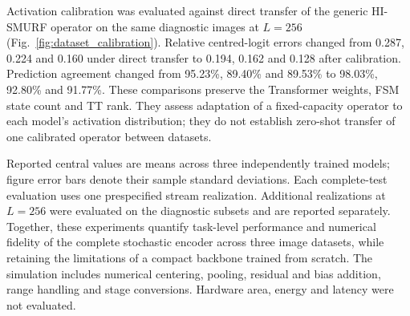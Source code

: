 Activation calibration was evaluated against direct transfer of the
generic HI-SMURF operator on the same diagnostic images at $L=256$
(Fig.~\ref{fig:dataset_calibration}). Relative centred-logit errors
changed from 0.287, 0.224 and 0.160 under direct transfer to
0.194, 0.162 and 0.128 after calibration. Prediction agreement changed
from 95.23\%, 89.40\% and 89.53\% to
98.03\%, 92.80\% and 91.77\%. These comparisons preserve the
Transformer weights, FSM state count and TT rank. They assess adaptation
of a fixed-capacity operator to each model's activation distribution;
they do not establish zero-shot transfer of one calibrated operator
between datasets.

Reported central values are means across three independently trained
models; figure error bars denote their sample standard deviations.
Each complete-test evaluation uses one prespecified stream realization.
Additional realizations at $L=256$ were evaluated on the diagnostic
subsets and are reported separately. Together, these experiments quantify
task-level performance and numerical fidelity of the complete stochastic
encoder across three image datasets, while retaining the limitations of
a compact backbone trained from scratch. The simulation includes
numerical centering, pooling, residual and bias addition, range handling
and stage conversions. Hardware area, energy and latency were not
evaluated.
